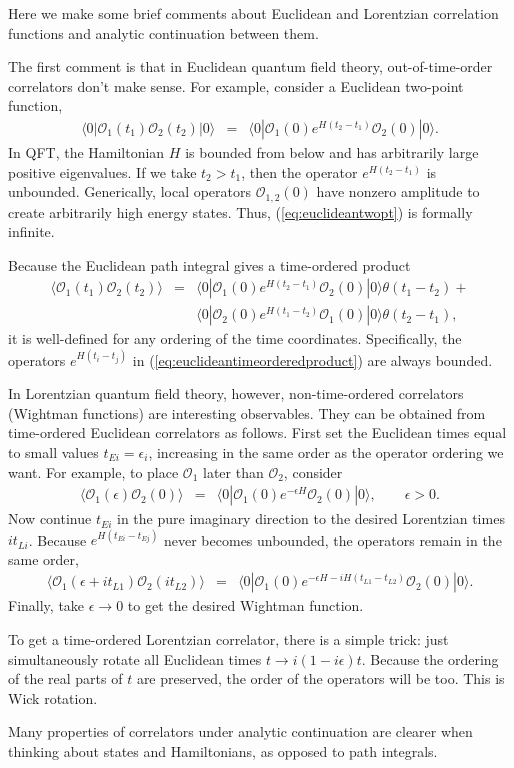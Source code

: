 \documentclass{ws-rv9x6}
\newcommand\be{\begin{eqnarray}}
\newcommand\ee{\end{eqnarray}}
\newcommand\cO{\mathcal{O}}
\newcommand\e\epsilon
\newcommand\<\langle
\renewcommand\>\rangle
\newcommand\nn{\nonumber}
\renewcommand\.{\cdot}
\renewcommand\th{\theta}
\begin{document}
\begin{appendix}
\label{app:analyticcontinuation}

Here we make some brief comments about Euclidean and Lorentzian correlation functions and analytic continuation between them.  

The first comment is that in Euclidean quantum field theory, out-of-time-order correlators don't make sense.  For example, consider a Euclidean two-point function,
\be
\label{eq:euclideantwopt}
\<0|\cO_1(t_1)\cO_2(t_2)|0\> &=& \<0| \cO_1(0) e^{H(t_2-t_1)} \cO_2(0)|0\>.
\ee
In QFT, the Hamiltonian $H$ is bounded from below and has arbitrarily large positive eigenvalues.  If we take $t_2 > t_1$, then the operator $e^{H(t_2-t_1)}$ is unbounded.  Generically, local operators $\cO_{1,2}(0)$ have nonzero amplitude to create arbitrarily high energy states. Thus, (\ref{eq:euclideantwopt}) is formally infinite.

Because the Euclidean path integral gives a time-ordered product
\be
\label{eq:euclideantimeorderedproduct}
\<\cO_1(t_1)\cO_2(t_2)\> &=& \<0|\cO_1(0)e^{H(t_2-t_1)}\cO_2(0)|0\>\th(t_1-t_2)+\nn\\
&& \<0|\cO_2(0)e^{H(t_1-t_2)}\cO_1(0)|0\>\th(t_2-t_1),
\ee
it is well-defined for any ordering of the time coordinates. Specifically, the operators $e^{H(t_i-t_j)}$ in (\ref{eq:euclideantimeorderedproduct}) are always bounded.

In Lorentzian quantum field theory, however,  non-time-ordered correlators (Wightman functions) are interesting observables.  They can be obtained from time-ordered Euclidean correlators as follows.  First set the Euclidean times equal to small values $t_{Ei}=\e_i$, increasing in the same order as the operator ordering we want.  For example, to place $\cO_1$ later than $\cO_2$, consider
\be
\<\cO_1(\e)\cO_2(0)\> &=& \<0|\cO_1(0)e^{-\e H}\cO_2(0)|0\>,\qquad \e>0.
\ee
Now continue $t_{Ei}$ in the pure imaginary direction to the desired Lorentzian times $it_{Li}$.  Because $e^{H(t_{Ei}-t_{Ej})}$ never becomes unbounded, the operators remain in the same order,
\be
\<\cO_1(\e+i t_{L1})\cO_2(it_{L2})\> &=& \<0|\cO_1(0)e^{-\e H - iH(t_{L1}-t_{L2})}\cO_2(0)|0\>.
\ee
Finally, take $\e\to 0$ to get the desired Wightman function.

To get a time-ordered Lorentzian correlator, there is a simple trick: just simultaneously rotate all Euclidean times $t\to i (1-i\e) t$. Because the ordering of the real parts of $t$ are preserved, the order of the operators will be too. This is Wick rotation.

Many properties of correlators under analytic continuation are clearer when thinking about states and Hamiltonians, as opposed to path integrals.

\vspace{0.2in}

\end{appendix}
\end{document}
